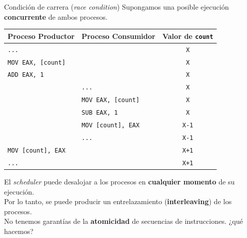 \documentclass[aspectratio=169]{beamer}
\begin{document}
\begin{frame}[fragile,t]{Condición de carrera (\emph{race condition})}
    \small
    Supongamos una posible ejecución \textbf{concurrente} de ambos procesos.\\
    \pause
    \begin{center}
        \begin{tabular}{|l|l|c|}
            \hline
            \multicolumn{1}{|c|}{Proceso Productor} & \multicolumn{1}{c|}{Proceso Consumidor} & Valor de \texttt{count}\\ \hline
            \texttt{...}                   &                               & \texttt{X}        \\
            \texttt{MOV EAX, [count]}      &                               & \texttt{X}        \\
            \texttt{ADD EAX, 1}            &                               & \texttt{X}        \\
                                           & \texttt{...}                  & \texttt{X}        \\
                                           & \texttt{MOV EAX, [count]}     & \texttt{X}        \\
                                           & \texttt{SUB EAX, 1}           & \texttt{X}        \\
                                           & \texttt{MOV [count], EAX}     & \texttt{X-1}      \\ 
                                           & \texttt{...}                  & \texttt{X-1}      \\
            \texttt{MOV [count], EAX}      &                               & \texttt{X+1}      \\ 
            \texttt{...}                   &                               & \texttt{X+1}      \\ \hline
        \end{tabular}
    \end{center}
    \pause
    El \textit{scheduler} puede desalojar a los procesos en \textbf{cualquier momento} de su ejecución.\\
    Por lo tanto, se puede producir un entrelazamiento (\textcolor{naranjauca}{\textbf{interleaving}}) de los procesos.\\
    \pause
    No tenemos garantías de la \textcolor{naranjauca}{\textbf{atomicidad}} de secuencias de instrucciones. \textcolor{verdeuca}{¿qué hacemos?}
\end{frame}
\end{document}
